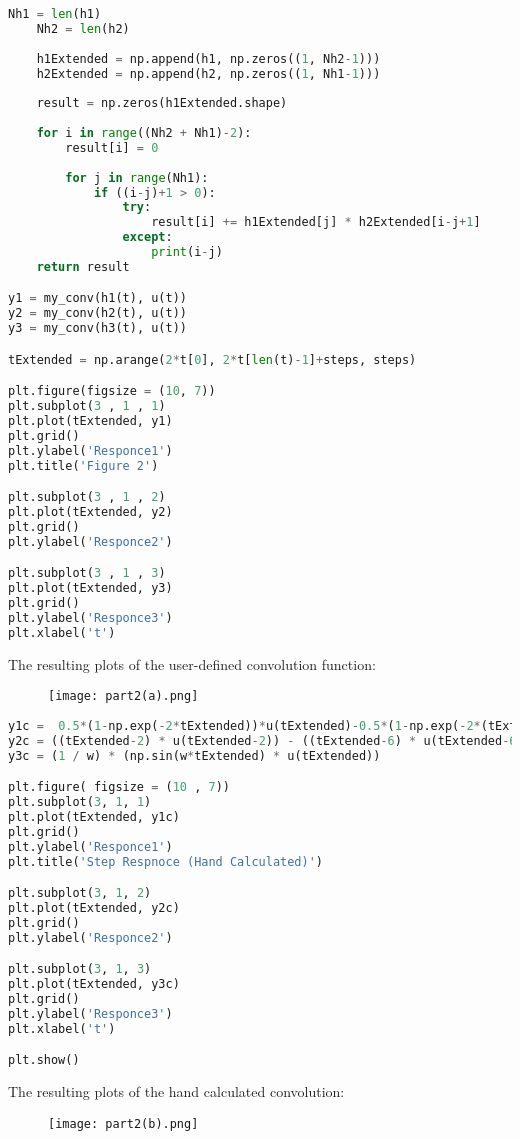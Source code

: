 \documentclass[12pt,a4paper]{article}
\begin{document}
\begin{itemize}
\begin{lstlisting}[language=Python, caption={Step response using user-defined function}, label={lst:code}, mathescape=true, breaklines=true]
    Nh1 = len(h1)
    Nh2 = len(h2)
     
    h1Extended = np.append(h1, np.zeros((1, Nh2-1))) 
    h2Extended = np.append(h2, np.zeros((1, Nh1-1)))
     
    result = np.zeros(h1Extended.shape)
     
    for i in range((Nh2 + Nh1)-2): 
        result[i] = 0  
          
        for j in range(Nh1): 
            if ((i-j)+1 > 0): 
                try: 
                    result[i] += h1Extended[j] * h2Extended[i-j+1]
                except:
                    print(i-j)                 
    return result

y1 = my_conv(h1(t), u(t)) 
y2 = my_conv(h2(t), u(t)) 
y3 = my_conv(h3(t), u(t))

tExtended = np.arange(2*t[0], 2*t[len(t)-1]+steps, steps)

plt.figure(figsize = (10, 7))
plt.subplot(3 , 1 , 1)
plt.plot(tExtended, y1)
plt.grid()
plt.ylabel('Responce1')
plt.title('Figure 2')

plt.subplot(3 , 1 , 2)
plt.plot(tExtended, y2)
plt.grid()
plt.ylabel('Responce2')

plt.subplot(3 , 1 , 3)
plt.plot(tExtended, y3)
plt.grid()
plt.ylabel('Responce3')
plt.xlabel('t')
\end{lstlisting}
\clearpage

    The resulting plots of the user-defined convolution function:\\
\begin{figure}[h]
    \centering
    \texttt{[image: part2(a).png]}
\end{figure}\textbf{}

\begin{lstlisting}[language=Python, caption={Step response by hand}, label={lst:code}, mathescape=true, breaklines=true]
y1c =  0.5*(1-np.exp(-2*tExtended))*u(tExtended)-0.5*(1-np.exp(-2*(tExtended-3)))*u(tExtended-3)
y2c = ((tExtended-2) * u(tExtended-2)) - ((tExtended-6) * u(tExtended-6))
y3c = (1 / w) * (np.sin(w*tExtended) * u(tExtended))

plt.figure( figsize = (10 , 7))
plt.subplot(3, 1, 1)
plt.plot(tExtended, y1c)
plt.grid()
plt.ylabel('Responce1')
plt.title('Step Respnoce (Hand Calculated)')

plt.subplot(3, 1, 2)
plt.plot(tExtended, y2c)
plt.grid()
plt.ylabel('Responce2')

plt.subplot(3, 1, 3)
plt.plot(tExtended, y3c)
plt.grid()
plt.ylabel('Responce3')
plt.xlabel('t')

plt.show()
\end{lstlisting}
\clearpage

    The resulting plots of the hand calculated convolution:\\
\begin{figure}[h]
    \centering
    \texttt{[image: part2(b).png]}
\end{figure}\textbf{}

\end{itemize}
\end{document}
